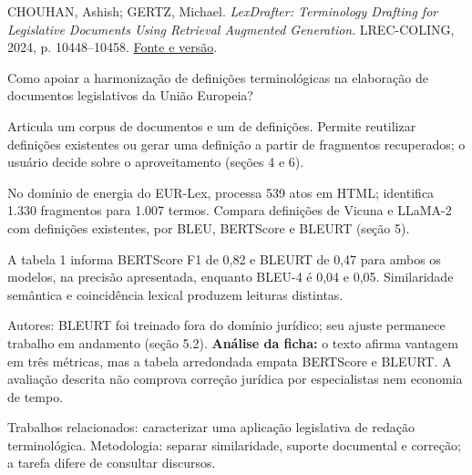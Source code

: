 {\small CHOUHAN, Ashish; GERTZ, Michael. \textit{LexDrafter: Terminology Drafting for Legislative Documents Using Retrieval Augmented Generation}. LREC-COLING, 2024, p. 10448--10458. \href{https://aclanthology.org/2024.lrec-main.913/}{Fonte e versão}.\par}

Como apoiar a harmonização de definições terminológicas na elaboração de documentos legislativos da União Europeia?

Articula um corpus de documentos e um de definições. Permite reutilizar definições existentes ou gerar uma definição a partir de fragmentos recuperados; o usuário decide sobre o aproveitamento (seções 4 e 6).

No domínio de energia do EUR-Lex, processa 539 atos em HTML; identifica 1.330 fragmentos para 1.007 termos. Compara definições de Vicuna e LLaMA-2 com definições existentes, por BLEU, BERTScore e BLEURT (seção 5).

A tabela 1 informa BERTScore F1 de 0,82 e BLEURT de 0,47 para ambos os modelos, na precisão apresentada, enquanto BLEU-4 é 0,04 e 0,05. Similaridade semântica e coincidência lexical produzem leituras distintas.

\begin{itemize}
\end{itemize}

Autores: BLEURT foi treinado fora do domínio jurídico; seu ajuste permanece trabalho em andamento (seção 5.2). \textbf{Análise da ficha:} o texto afirma vantagem em três métricas, mas a tabela arredondada empata BERTScore e BLEURT. A avaliação descrita não comprova correção jurídica por especialistas nem economia de tempo.

Trabalhos relacionados: caracterizar uma aplicação legislativa de redação terminológica. Metodologia: separar similaridade, suporte documental e correção; a tarefa difere de consultar discursos.

